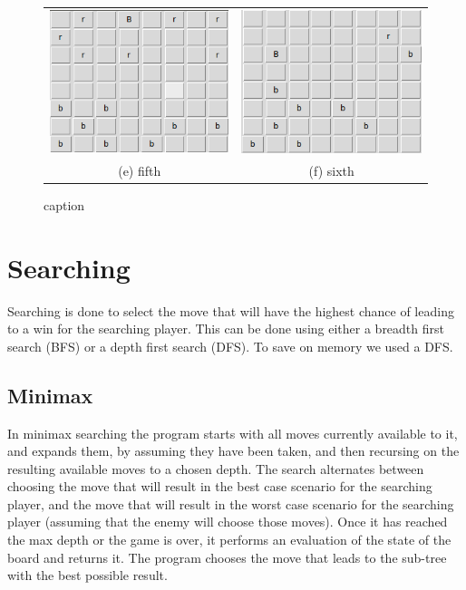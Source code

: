 \documentclass{article}
\begin{document}
\begin{figure}
\begin{tabular}{cc}
 \includegraphics[width=65mm]{images/game-4.png} &   \includegraphics[width=65mm]{images/game-5.png} \\
 (e) fifth & (f) sixth \\[6pt]
\end{tabular}
\caption{caption}
\end{figure}

\section{Searching}

Searching is done to select the move that will have the highest chance of
leading to a win for the searching player.  This can be done using either a
breadth first search (BFS) or a depth first search (DFS). To save on memory
we used a DFS.

\subsection{Minimax}

In minimax searching the program starts with all moves currently available to
it, and expands them, by assuming they have been taken, and then recursing on
the resulting available moves to a chosen depth. The search alternates between
choosing the move that will result in the best case scenario for the searching
player, and the move that will result in the worst case scenario for the
searching player (assuming that the enemy will choose those moves). Once it has
reached the max depth or the game is over, it performs an evaluation of the
state of the board and returns it. The program chooses the move that leads to
the sub-tree with the best possible result.
\end{document}
